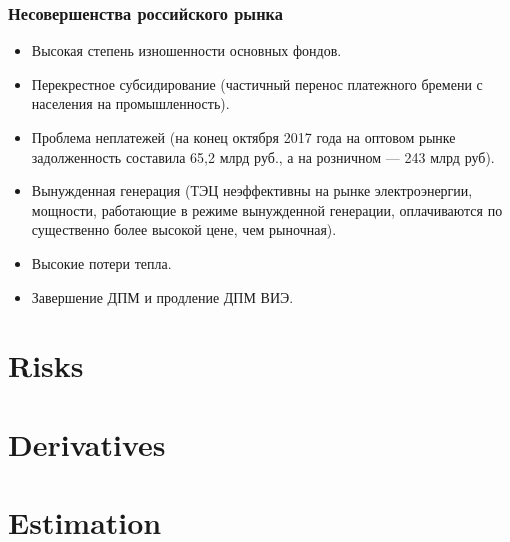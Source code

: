\documentclass[c, dvipsnames]{beamer}  %
\begin{document}
\begin{frame}[shrink=5]
\frametitle{Несовершенства российского рынка} 


\begin{itemize}
	\item  Высокая степень изношенности основных фондов.
	\item  Перекрестное субсидирование (частичный перенос платежного бремени с населения на промышленность).
	\item  Проблема неплатежей (на конец октября 2017 года на оптовом рынке задолженность составила 65,2 млрд руб., а на розничном — 243 млрд руб).
	\item  Вынужденная генерация  (ТЭЦ  неэффективны на рынке электроэнергии, мощности, работающие в режиме вынужденной генерации, оплачиваются по существенно более высокой цене, чем рыночная).
	\item  Высокие потери тепла.
	\item   Завершение ДПМ и продление ДПМ ВИЭ.
\end{itemize}



\end{frame}













\section{Risks}


\section{Derivatives}


\section{Estimation}
\end{document}
